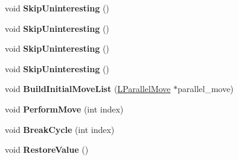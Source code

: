 \begin{DoxyCompactItemize}
\item 
void {\bfseries Skip\+Uninteresting} ()\hypertarget{classv8_1_1internal_1_1_b_a_s_e___e_m_b_e_d_d_e_d_a0c6235cd0100deba90aaa9f1ccebbd30}{}\label{classv8_1_1internal_1_1_b_a_s_e___e_m_b_e_d_d_e_d_a0c6235cd0100deba90aaa9f1ccebbd30}

\item 
void {\bfseries Skip\+Uninteresting} ()\hypertarget{classv8_1_1internal_1_1_b_a_s_e___e_m_b_e_d_d_e_d_a0c6235cd0100deba90aaa9f1ccebbd30}{}\label{classv8_1_1internal_1_1_b_a_s_e___e_m_b_e_d_d_e_d_a0c6235cd0100deba90aaa9f1ccebbd30}

\item 
void {\bfseries Skip\+Uninteresting} ()\hypertarget{classv8_1_1internal_1_1_b_a_s_e___e_m_b_e_d_d_e_d_a0c6235cd0100deba90aaa9f1ccebbd30}{}\label{classv8_1_1internal_1_1_b_a_s_e___e_m_b_e_d_d_e_d_a0c6235cd0100deba90aaa9f1ccebbd30}

\item 
void {\bfseries Skip\+Uninteresting} ()\hypertarget{classv8_1_1internal_1_1_b_a_s_e___e_m_b_e_d_d_e_d_a0c6235cd0100deba90aaa9f1ccebbd30}{}\label{classv8_1_1internal_1_1_b_a_s_e___e_m_b_e_d_d_e_d_a0c6235cd0100deba90aaa9f1ccebbd30}

\item 
void {\bfseries Build\+Initial\+Move\+List} (\hyperlink{classv8_1_1internal_1_1_l_parallel_move}{L\+Parallel\+Move} $\ast$parallel\+\_\+move)\hypertarget{classv8_1_1internal_1_1_b_a_s_e___e_m_b_e_d_d_e_d_a18e46b4919bd34c5ff192a955f86238d}{}\label{classv8_1_1internal_1_1_b_a_s_e___e_m_b_e_d_d_e_d_a18e46b4919bd34c5ff192a955f86238d}

\item 
void {\bfseries Perform\+Move} (int index)\hypertarget{classv8_1_1internal_1_1_b_a_s_e___e_m_b_e_d_d_e_d_a01fea4beaf81ccc3a326c14fdda8a2aa}{}\label{classv8_1_1internal_1_1_b_a_s_e___e_m_b_e_d_d_e_d_a01fea4beaf81ccc3a326c14fdda8a2aa}

\item 
void {\bfseries Break\+Cycle} (int index)\hypertarget{classv8_1_1internal_1_1_b_a_s_e___e_m_b_e_d_d_e_d_a5de6146d54eea60dd1d47b73b51a4905}{}\label{classv8_1_1internal_1_1_b_a_s_e___e_m_b_e_d_d_e_d_a5de6146d54eea60dd1d47b73b51a4905}

\item 
void {\bfseries Restore\+Value} ()\hypertarget{classv8_1_1internal_1_1_b_a_s_e___e_m_b_e_d_d_e_d_a5dca5ddf8849980c4195449ae562e8b9}{}\label{classv8_1_1internal_1_1_b_a_s_e___e_m_b_e_d_d_e_d_a5dca5ddf8849980c4195449ae562e8b9}


\end{DoxyCompactItemize}
